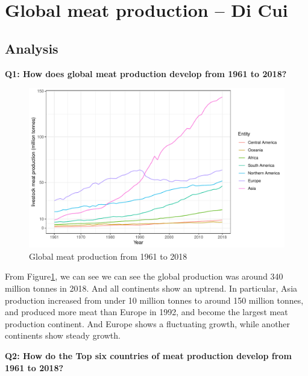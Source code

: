 \documentclass[11pt,a4paper,]{article}
\begin{document}
\section*{Global meat production -- Di Cui}

\subsection*{Analysis}

\textbf{Q1: How does global meat production develop from 1961 to 2018?}

\begin{figure}
\centering
\includegraphics{report_files/figure-latex/continent-figure-1.pdf}
\caption{\label{fig:continent-figure}Global meat production from 1961 to 2018}
\end{figure}

From Figure\ref{fig:continent-figure}, we can see we can see the global production was around 340 million tonnes in 2018. And all continents show an uptrend.
In particular, Asia production increased from under 10 million tonnes to around 150 million tonnes, and produced more meat than Europe in 1992, and become the largest meat production continent. And Europe shows a fluctuating growth, while another continents show steady growth.

\clearpage

\textbf{Q2: How do the Top six countries of meat production develop from 1961 to 2018?}
\end{document}
